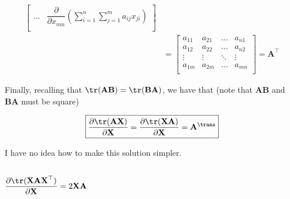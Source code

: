 \begin{align*}
\begin{bmatrix}
        \dots & 
        \displaystyle \dfrac{\partial}{\partial x_{mn}} \left( \sum_{i = 1}^{n} \sum_{j = 1}^{m} a_{ij}x_{ji} \right) \\
    \end{bmatrix} \\
    &= \begin{bmatrix}
            a_{11} & a_{21} & \dots & a_{n1} \\
            a_{12} & a_{22} & \dots & a_{n2} \\
            \vdots & \vdots & \ddots & \vdots \\
            a_{1m} & a_{2m} & \dots & a_{mn} \\
        \end{bmatrix} = \mathbf{A}^\top
\end{align*}

Finally, recalling that \(\tr( \mathbf{AB} ) = \tr( \mathbf{BA} )\), we have that (note that \(\mathbf{AB}\) and \(\mathbf{BA}\) must be square)

\begin{align}
    \boxed{\dfrac{\partial \tr(\mathbf{A} \mathbf{X})}{\partial \mathbf{X}} = \dfrac{\partial \tr(\mathbf{X} \mathbf{A})}{\partial \mathbf{X}} = \mathbf{A}^\trans}
\end{align}

I have no idea how to make this solution simpler.

\subsection{\(\dfrac{\partial \tr(\mathbf{XAX}^\top)}{\partial \mathbf{X}} = 2\mathbf{XA}\)}

